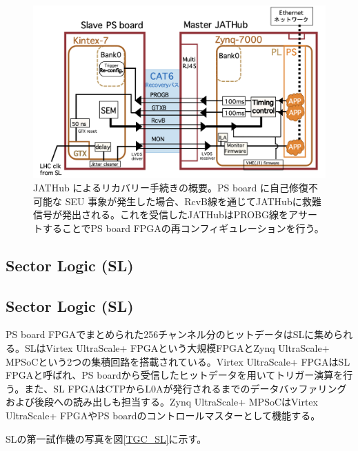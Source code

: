     \begin{figure} 
    \centering
    \includegraphics[width=16cm]{fig/QAQC/JATHubsem.png}
    \caption[JATHub によるリカバリー手続きの概要]{JATHub によるリカバリー手続きの概要\cite{mt_atanaka}。PS board に自己修復不可能な SEU 事象が発生した場合、RcvB線を通じてJATHubに救難信号が発出される。これを受信したJATHubはPROBG線をアサートすることでPS board FPGAの再コンフィギュレーションを行う。}
    \label{JATHubsem}
    \end{figure}

        \subsection*{Sector Logic (SL) }


        \subsection*{Sector Logic (SL) }
PS board FPGAでまとめられた256チャンネル分のヒットデータはSLに集められる。SLはVirtex UltraScale+ FPGAという大規模FPGAとZynq UltraScale+ MPSoCという2つの集積回路を搭載されている。Virtex UltraScale+ FPGAはSL FPGAと呼ばれ、PS boardから受信したヒットデータを用いてトリガー演算を行う。また、SL FPGAはCTPからL0Aが発行されるまでのデータバッファリングおよび後段への読み出しも担当する。Zynq UltraScale+ MPSoCはVirtex UltraScale+ FPGAやPS boardのコントロールマスターとして機能する。

SLの第一試作機の写真を図\ref{TGC_SL}に示す。

